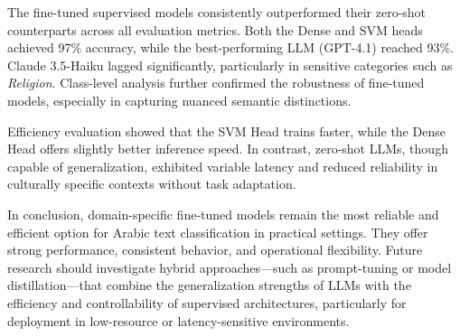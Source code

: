 \documentclass[preprint,12pt,authoryear]{elsarticle}
\begin{document}
The fine-tuned supervised models consistently outperformed their zero-shot counterparts across all evaluation metrics. Both the Dense and SVM heads achieved 97\% accuracy, while the best-performing LLM (GPT-4.1) reached 93\%. Claude 3.5-Haiku lagged significantly, particularly in sensitive categories such as \textit{Religion}. Class-level analysis further confirmed the robustness of fine-tuned models, especially in capturing nuanced semantic distinctions.

Efficiency evaluation showed that the SVM Head trains faster, while the Dense Head offers slightly better inference speed. In contrast, zero-shot LLMs, though capable of generalization, exhibited variable latency and reduced reliability in culturally specific contexts without task adaptation.

In conclusion, domain-specific fine-tuned models remain the most reliable and efficient option for Arabic text classification in practical settings. They offer strong performance, consistent behavior, and operational flexibility. Future research should investigate hybrid approaches—such as prompt-tuning or model distillation—that combine the generalization strengths of LLMs with the efficiency and controllability of supervised architectures, particularly for deployment in low-resource or latency-sensitive environments.

 

\end{document}
